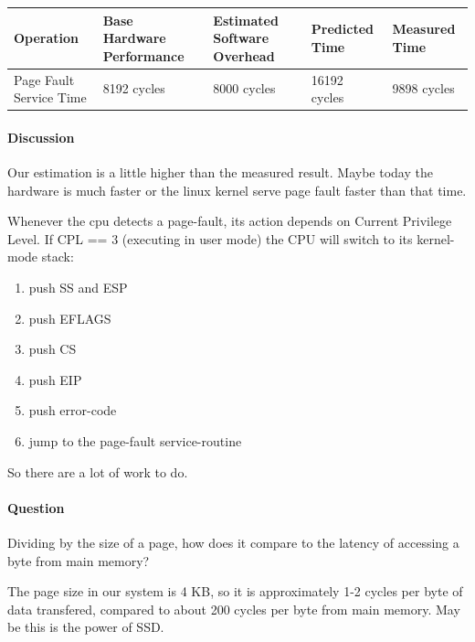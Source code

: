 \begin{center}
\begin{tabular}{| p{3cm} | p{3cm} | p{3cm} | p{3cm} | p{3cm} |}
Operation  & Base Hardware Performance  & Estimated Software Overhead  & Predicted Time  & Measured Time   \\
\hline
Page Fault Service Time & 8192 cycles& 8000 cycles& 16192 cycles& 9898 cycles\\

\end{tabular}
\end{center}

\paragraph{Discussion}
Our estimation is a little higher than the measured result. Maybe today the hardware is much faster or the linux kernel serve page fault faster than that time.

Whenever the cpu detects a page-fault, its action depends on Current Privilege Level. If  CPL == 3  (executing in user mode)
the CPU will switch to its kernel-mode stack:

\begin{enumerate}
\item push  SS  and  ESP
\item push  EFLAGS
\item push  CS
\item push  EIP
\item push  error-code
\item jump to the page-fault service-routine  
\end{enumerate}

So there are a lot of work to do. 


\paragraph{Question} Dividing by the size of a page, how does it compare to the latency of accessing a byte from main memory?

The page size in our system is 4 KB, so it is approximately 1-2 cycles per byte of data transfered, compared to about 200 cycles per byte from main memory. May be this is the power of SSD.
